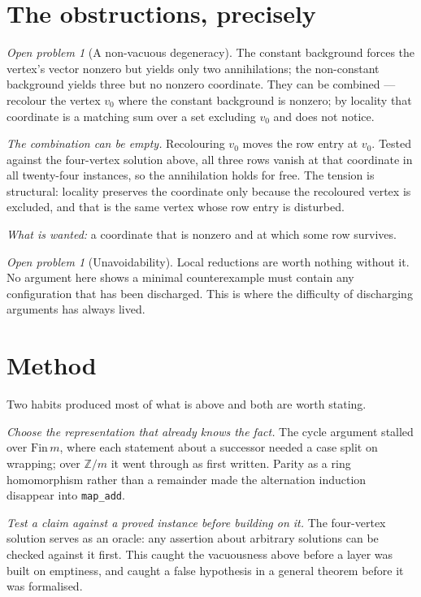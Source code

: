 \documentclass[11pt]{article}
\theoremstyle{definition}
\theoremstyle{remark}
\newtheorem{openq}[theorem]{Open problem}
\begin{document}
\section{The obstructions, precisely}\label{sec:obstruct}

\begin{openq}[A non-vacuous degeneracy]
The constant background forces the vertex's vector nonzero but yields only two
annihilations; the non-constant background yields three but no nonzero coordinate.
They can be combined --- recolour the vertex $v_0$ where the constant background is
nonzero; by locality that coordinate is a matching sum over a set excluding $v_0$
and does not notice.

\emph{The combination can be empty.} Recolouring $v_0$ moves the row entry at
$v_0$. Tested against the four-vertex solution above, all three rows vanish at that
coordinate in all twenty-four instances, so the annihilation holds for free. The
tension is structural: locality preserves the coordinate only because the recoloured
vertex is excluded, and that is the same vertex whose row entry is disturbed.

\emph{What is wanted:} a coordinate that is nonzero and at which some row survives.
\end{openq}

\begin{openq}[Unavoidability]
Local reductions are worth nothing without it. No argument here shows a minimal
counterexample must contain any configuration that has been discharged. This is
where the difficulty of discharging arguments has always lived.
\end{openq}

\section{Method}

Two habits produced most of what is above and both are worth stating.

\emph{Choose the representation that already knows the fact.} The cycle argument
stalled over $\mathrm{Fin}\,m$, where each statement about a successor needed a case
split on wrapping; over $\mathbb{Z}/m$ it went through as first written. Parity as a
ring homomorphism rather than a remainder made the alternation induction disappear
into \texttt{map\_add}.

\emph{Test a claim against a proved instance before building on it.} The
four-vertex solution serves as an oracle: any assertion about arbitrary solutions
can be checked against it first. This caught the vacuousness above before a layer
was built on emptiness, and caught a false hypothesis in a general theorem before it
was formalised.
\end{document}
